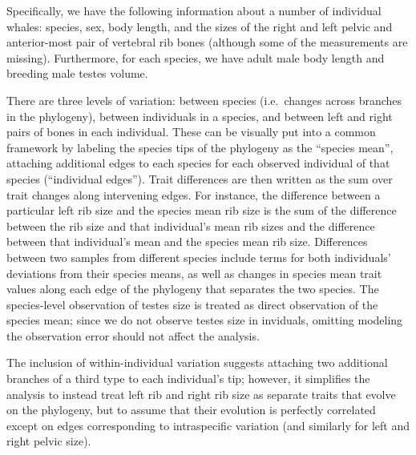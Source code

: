 \documentclass[12pt]{article}
\begin{document}
Specifically, we have the following information about a number of individual whales:
species, sex, body length,
and the sizes of the right and left pelvic and anterior-most pair of vertebral rib bones
(although some of the measurements are missing).
Furthermore, for each species, we have
adult male body length and
breeding male testes volume.

There are three levels of variation:
between species (i.e.\ changes across branches in the phylogeny),
between individuals in a species,
and between left and right pairs of bones in each individual.
These can be visually put into a common framework by 
labeling the species tips of the phylogeny as the ``species mean'',
attaching additional edges to each species for each observed individual of that species (``individual edges'').
Trait differences are then written as the sum over trait changes along intervening edges.
For instance, the difference between a particular left rib size and the species mean rib size
is the sum of the difference between the rib size and that individual's mean rib sizes 
and the difference between that individual's mean and the species mean rib size.
Differences between two samples from different species include terms for both individuals' deviations from their species means,
as well as changes in species mean trait values along each edge of the phylogeny that separates the two species.
The species-level observation of testes size is treated as direct observation of the species mean;
since we do not observe testes size in inviduals, omitting modeling the observation error should not affect the analysis.

The inclusion of within-individual variation suggests attaching two additional branches of a third type
to each individual's tip;
however, it simplifies the analysis to instead treat left rib and right rib size 
as separate traits that evolve on the phylogeny,
but to assume that their evolution is perfectly correlated except on edges corresponding to intraspecific variation
(and similarly for left and right pelvic size).

\end{document}
